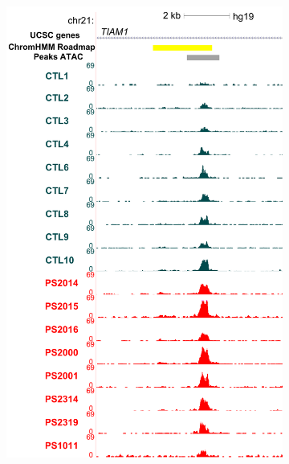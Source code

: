\begin{figure}[htbp]
\begin{subfigure}{0.5\textwidth}
\caption{\textbf{}}
\end{subfigure}
\begin{subfigure}{0.45\textwidth}
\centering
\includegraphics[width=\textwidth]{./Results2/pdfs/ATAC_CD8_peak_TIAM1_track}
\caption{\textbf{}}
\end{subfigure}%
\begin{subfigure}{0.45\textwidth}
\centering

\end{subfigure}
\end{figure}
